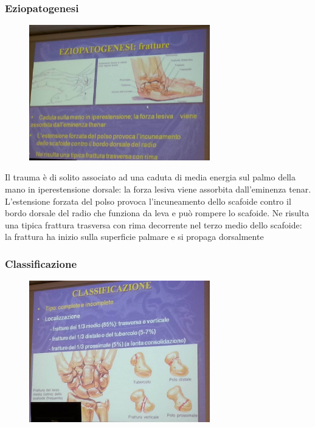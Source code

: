 \subsubsection{Eziopatogenesi}

\begin{figure}[!ht]
\centering
\includegraphics[width=0.7\textwidth]{003/image8.jpeg}
\end{figure}

Il trauma è di solito associato ad una caduta di media energia sul palmo della mano in iperestensione dorsale: la forza lesiva viene assorbita dall'eminenza tenar. L'estensione forzata del polso provoca l'incuneamento dello scafoide contro il bordo dorsale del radio che
funziona da leva e può rompere lo scafoide. Ne risulta una tipica frattura trasversa con rima decorrente nel terzo medio dello scafoide: la frattura ha inizio sulla superficie palmare e si propaga dorsalmente

\subsubsection{Classificazione}

\begin{figure}[!ht]
\centering
\includegraphics[width=0.7\textwidth]{003/image9.jpeg}
\end{figure}

